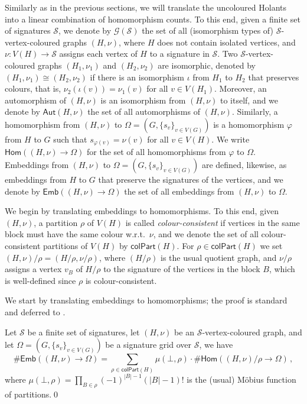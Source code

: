 \documentclass[authorcolumns,numberwithinsect]{no-lipics-v2022}
\newcommand{\homs}[2]{\mathsf{Hom}(#1 \to #2)}
\newcommand{\embs}[2]{\mathsf{Emb}(#1 \to #2)}
\begin{document}
Similarly as in the previous sections, we will translate the uncoloured Holants into a linear combination of homomorphism counts. To this end, given a finite set of signatures $\mathcal{S}$, we denote by $\mathcal{G}(\mathcal S)$ the set of all (isomorphism types of) $\mathcal{S}$-vertex-coloured graphs $(H,\nu)$, where $H$ does not contain isolated vertices, and $\nu:V(H)\to \mathcal{S}$ assigns each vertex of $H$ to a signature in $\mathcal{S}$. Two $\mathcal{S}$-vertex-coloured graphs $(H_1,\nu_1)$ and $(H_2,\nu_2)$ are isomorphic, denoted by $(H_1,\nu_1)\cong(H_2,\nu_2)$ if there is an isomorphism $\iota$ from $H_1$ to $H_2$ that preserves colours, that is, $\nu_2(\iota(v))=\nu_1(v)$ for all $v\in V(H_1)$. Moreover, an automorphism of $(H,\nu)$ is an isomorphism from $(H,\nu)$ to itself, and we denote by $\mathsf{Aut}(H,\nu)$ the set of all automorphisms of $(H,\nu)$. Similarly, a homomorphism from $(H,\nu)$ to $\Omega=(G,\{s_v\}_{v\in V(G)})$ is a homomorphism $\varphi$ from $H$ to $G$ such that $s_{\varphi(v)} = \nu(v)$ for all $v\in V(H)$. We write $\homs{(H,\nu)}{\Omega}$ for the set of all homomorphisms from $\varphi$ to $\Omega$. Embeddings from $(H,\nu)$ to $\Omega=(G,\{s_v\}_{v\in V(G)})$ are defined, likewise, as embeddings from $H$ to $G$ that preserve the signatures of the vertices, and we denote by $\embs{(H,\nu)}{\Omega}$ the set of all embeddings from $(H,\nu)$ to $\Omega$.

We begin by translating embeddings to homomorphisms. To this end, given $(H,\nu)$, a partition $\rho$ of $V(H)$ is called \emph{colour-consistent} if vertices in the same block must have the same colour w.r.t.\ $\nu$, and we denote the set of all colour-consistent partitions of $V(H)$ by $\mathsf{colPart}(H)$. For $\rho \in \mathsf{colPart}(H)$ we set $(H,\nu)/\rho = (H/\rho,\nu/\rho)$, where $(H/\rho)$ is the usual quotient graph, and $\nu/\rho$ assigns a vertex $v_B$ of $H/\rho$ to the signature of the vertices in the block $B$, which is well-defined since $\rho$ is colour-consistent.

We start by translating embeddings to homomorphisms; the proof is standard and deferred to .
\begin{lemma}\label{lem:colEmb_to_colHom_S-coloured}
    Let $\mathcal{S}$ be a finite set of signatures, let $(H,\nu)$ be an $\mathcal{S}$-vertex-coloured graph, and let $\Omega=(G,\{s_v\}_{v\in V(G)})$ be a signature grid over $\mathcal{S}$, we have
    \[ \#\embs{(H,\nu)}{\Omega} = \sum_{\rho \in \mathsf{colPart}(H)} \mu(\bot,\rho)\cdot \#\homs{(H,\nu)/\rho}{\Omega}\,,\]
    where $\mu(\bot,\rho)=\prod_{B\in \rho}(-1)^{|B|-1}(|B|-1)!$ is the (usual) M\"obius function of partitions.\qed
\end{lemma}
\end{document}
